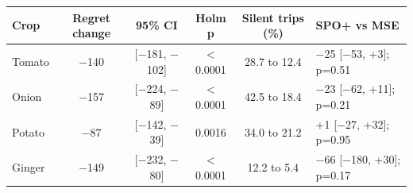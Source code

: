 \renewcommand{\arraystretch}{1.25}
\footnotesize
\begin{tabular}{|l|c|c|c|c|l|}
\hline
\textbf{Crop} & \textbf{Regret change} & \textbf{95\% CI} & \textbf{Holm p} & \textbf{Silent trips (\%)} & \textbf{SPO+ vs MSE} \\
\hline
Tomato & $-$140 & [$-$181, $-$102] & $<$0.0001 & 28.7 to 12.4 & $-$25 [$-$53, +3]; p=0.51 \\
\hline
Onion & $-$157 & [$-$224, $-$89] & $<$0.0001 & 42.5 to 18.4 & $-$23 [$-$62, +11]; p=0.21 \\
\hline
Potato & $-$87 & [$-$142, $-$39] & 0.0016 & 34.0 to 21.2 & +1 [$-$27, +32]; p=0.95 \\
\hline
Ginger & $-$149 & [$-$232, $-$80] & $<$0.0001 & 12.2 to 5.4 & $-$66 [$-$180, +30]; p=0.17 \\
\hline
\end{tabular}
